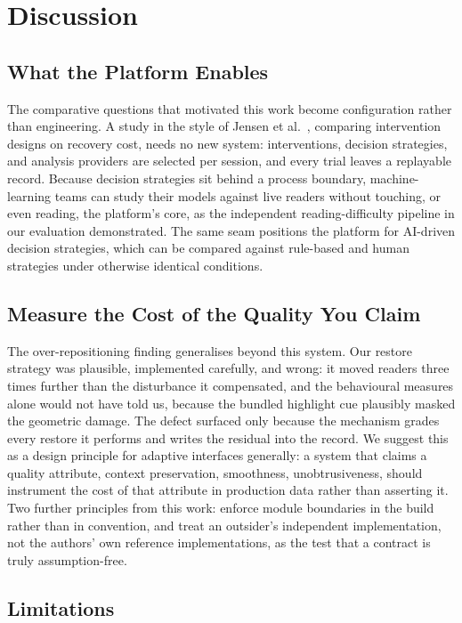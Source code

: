 \section{Discussion}
\label{sec:discussion}

\subsection{What the Platform Enables}

The comparative questions that motivated this work become configuration rather than engineering.
A study in the style of Jensen et al.~\cite{jensen2025context}, comparing intervention designs on recovery cost, needs no new system: interventions, decision strategies, and analysis providers are selected per session, and every trial leaves a replayable record.
Because decision strategies sit behind a process boundary, machine-learning teams can study their models against live readers without touching, or even reading, the platform's core, as the independent reading-difficulty pipeline in our evaluation demonstrated.
The same seam positions the platform for AI-driven decision strategies, which can be compared against rule-based and human strategies under otherwise identical conditions.

\subsection{Measure the Cost of the Quality You Claim}

The over-repositioning finding generalises beyond this system.
Our restore strategy was plausible, implemented carefully, and wrong: it moved readers three times further than the disturbance it compensated, and the behavioural measures alone would not have told us, because the bundled highlight cue plausibly masked the geometric damage.
The defect surfaced only because the mechanism grades every restore it performs and writes the residual into the record.
We suggest this as a design principle for adaptive interfaces generally: a system that claims a quality attribute, context preservation, smoothness, unobtrusiveness, should instrument the cost of that attribute in production data rather than asserting it.
Two further principles from this work: enforce module boundaries in the build rather than in convention, and treat an outsider's independent implementation, not the authors' own reference implementations, as the test that a contract is truly assumption-free.

\subsection{Limitations}

